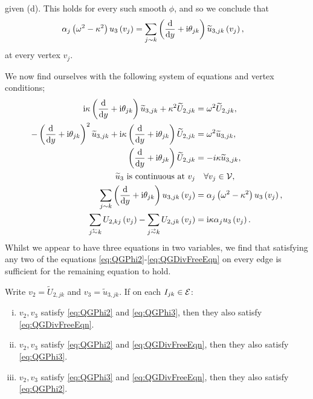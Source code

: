 given (d).
This holds for every such smooth $\phi$, and so we conclude that
\begin{align*}
	\alpha_j \left( \omega^2 - \kappa^2 \right) u_3\left( v_j \right) &= \sum_{j\sim k} \left(  \dfrac{\mathrm{d}}{\mathrm{d}y} + \mathrm{i}\theta_{jk}  \right)\widetilde{u}_{3,jk}\left( v_j \right),
\end{align*}
at every vertex $v_j$.

We now find ourselves with the following system of equations and vertex conditions; 
\begin{subequations}
	\begin{align}
		\rmi\wavenumber \bracs{ \diff{}{y} + \rmi\qm_{jk} }\widetilde{u}_{3,jk} + \wavenumber^2\widetilde{U}_{2,jk} &= \omega^2\widetilde{U}_{2,jk}, \label{eq:QGPhi2} \\
		-\bracs{ \diff{}{y} + \rmi\qm_{jk} }^2\widetilde{u}_{3,jk} + \rmi\wavenumber\bracs{ \diff{}{y} + \rmi\qm_{jk} }\widetilde{U}_{2,jk} &= \omega^2 \widetilde{u}_{3,jk}, \label{eq:QGPhi3} \\
		\bracs{ \diff{}{y} + \rmi\qm_{jk} }\widetilde{U}_{2,jk} &= -i\wavenumber\widetilde{u}_{3,jk}, \label{eq:QGDivFreeEqn} \\
		\widetilde{u}_3 \text{ is continuous at } v_j &\quad\forall v_j\in\vertSet, \\
		\sum_{j\con k} \bracs{ \diff{}{y} + \rmi\qm_{jk} }u_{3,jk}\bracs{v_j} &= \alpha_j \bracs{\omega^2 - \wavenumber^2} u_3\bracs{v_j}, \\
		\sum_{j\conRight k} U_{2,kj}\bracs{v_j} - \sum_{j\conLeft k} U_{2,jk}\bracs{v_j} &= \rmi\wavenumber\alpha_j u_3\bracs{v_j}.
	\end{align}
\end{subequations}
Whilst we appear to have three equations in two variables, we find that satisfying any two of the equations \eqref{eq:QGPhi2}-\eqref{eq:QGDivFreeEqn} on every edge is sufficient for the remaining equation to hold.
\begin{prop} \label{prop:TwoEquationsSufficient}
	Write $v_2 = \widetilde{U}_{2,jk}$ and $v_3 = \widetilde{u}_{3,jk}$.
	If on each $I_{jk}\in\mathcal{E}$:
	\begin{enumerate}[(i)]
		\item $v_2,v_3$ satisfy \eqref{eq:QGPhi2} and \eqref{eq:QGPhi3}, then they also satisfy \eqref{eq:QGDivFreeEqn}.
		\item $v_2,v_3$ satisfy \eqref{eq:QGPhi2} and \eqref{eq:QGDivFreeEqn}, then they also satisfy \eqref{eq:QGPhi3}.
		\item $v_2,v_3$ satisfy \eqref{eq:QGPhi3} and \eqref{eq:QGDivFreeEqn}, then they also satisfy \eqref{eq:QGPhi2}.
	\end{enumerate}
\end{prop}
